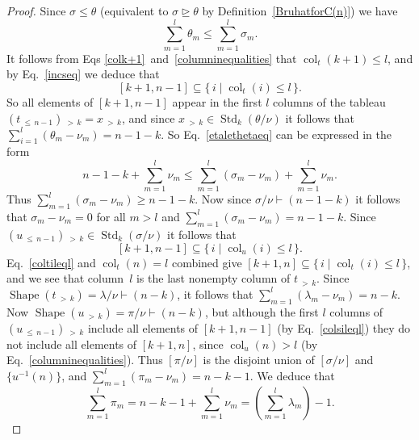 \documentclass[10pt]{amsart}
\theoremstyle{definition}
\DeclareMathOperator{\col}{col}
\newcommand{\morethan}[2]{#1\,{_{>\,#2}}}
\newcommand{\Lessthan}[2]{#1\,{_{\leqslant\,#2}}}
\DeclareMathOperator{\STD}{Std}
\DeclareMathOperator{\shape}{Shape}
\begin{document}
\begin{proof}
Since $\sigma\leqslant\theta$ (equivalent to $\sigma\trianglerighteq\theta$ by Definition~\ref{BruhatforC(n)}) we have
\begin{equation}\label{etalethetaeq}
\sum_{m=1}^l\theta_m\leqslant\sum_{m=1}^l\sigma_m.
\end{equation}
It follows from Eqs \eqref{colk+1}~and~\eqref{columninequalities} that $\col_t(k+1)\leqslant l$,
and by Eq.~\eqref{incseq} we deduce that
\begin{equation}\label{coltileql}
[k+1,n-1]\subseteq\{\,i\mid\col_t(i)\leqslant l\,\}.
\end{equation}
So all elements of $[k+1,n-1]$ appear in the first $l$ columns of
the tableau $\morethan{(\Lessthan t{n-1})}k=\morethan xk$, and since
$\morethan xk\in\STD_k(\theta/\nu)$ it follows that $\sum_{i=1}^l(\theta_m-\nu_m)=n-1-k$.
So Eq.~\eqref{etalethetaeq} can be expressed in the form
\begin{equation*}
n-1-k + \sum_{m=1}^l\nu_m \leqslant\sum_{m=1}^l (\sigma_m-\nu_m) + \sum_{m=1}^l\nu_m.
\end{equation*}
Thus $\sum_{m=1}^l (\sigma_m-\nu_m)\geqslant n-1-k$. Now since
$\sigma/\nu\vdash(n-1-k)$ it follows that $\sigma_m-\nu_m=0$ for
all $m>l$ and $\sum_{m=1}^l (\sigma_m-\nu_m)= n-1-k$.
Since $\morethan{(\Lessthan u{n-1})}k\in\STD_k(\sigma/\nu)$ it follows that
\begin{equation}\label{colsileql}
[k+1,n-1]\subseteq\{\,i\mid\col_u(i)\leqslant l\,\}.
\end{equation}
Eq.~\eqref{coltileql} and $\col_t(n)=l$ combined give
$[k+1,n]\subseteq\{\,i\mid\col_t(i)\leqslant l\,\}$, and we see that
column~$l$ is the last nonempty column of $\morethan tk$. Since
$\shape(\morethan tk)=\lambda/\nu\vdash (n-k)$,
it follows that $\sum_{m=1}^l(\lambda_m-\nu_m)=n-k$. Now
$\shape(\morethan uk)=\pi/\nu\vdash (n-k)$, but although
the first $l$ columns of $\morethan{(\Lessthan u{n-1})}k$ include
all elements of $[k+1,n-1]$ (by Eq.~\eqref{colsileql}) they do not include
all elements of $[k+1,n]$, since $\col_u(n)>l$ (by Eq.~\eqref{columninequalities}).
Thus $[\pi/\nu]$ is the disjoint union of $[\sigma/\nu]$ and $\{u^{-1}(n)\}$, and
$\sum_{m=1}^l(\pi_m-\nu_m)=n-k-1$. We deduce that
\begin{equation}\label{smuonemorethansnu}
\sum_{m=1}^l\pi_m = n-k-1+\sum_{m=1}^l\nu_m=
\left(\sum_{m=1}^l\lambda_m\right)-1.
\end{equation}


\end{proof}
\end{document}

